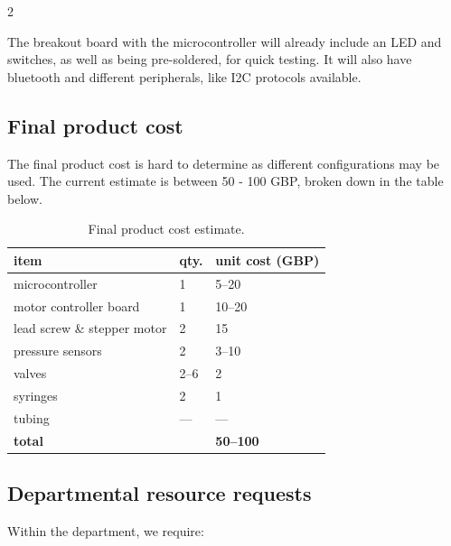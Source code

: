 \documentclass[10pt, a4paper]{article}
\begin{document}
\begin{multicols}{2}

    The breakout board with the microcontroller will already include an LED and switches, as well as being pre-soldered, for quick testing. It will also have bluetooth and different peripherals, like I2C protocols available.

    \subsection{Final product cost}
    The final product cost is hard to determine as different configurations may be used. The current estimate is between 50 - 100 GBP, broken down in the table below.

    \begin{table}[H]
        \small
        \centering
        \begin{tabular}{lll}
            \toprule
            \textbf{item}               & \textbf{qty.} & \textbf{unit cost (GBP)} \\
            \midrule
            microcontroller             & 1             & 5--20                    \\
            motor controller board      & 1             & 10--20                   \\
            lead screw \& stepper motor & 2             & 15                       \\
            pressure sensors            & 2             & 3--10                    \\
            valves                      & 2--6          & 2                        \\
            syringes                    & 2             & 1                        \\
            tubing                      & ---           & ---                      \\
            \midrule
            \textbf{total}              &               & \textbf{50--100}         \\
            \bottomrule
        \end{tabular}
        \caption{Final product cost estimate.}
    \end{table}

    \subsection{Departmental resource requests}
    Within the department, we require:


\end{multicols}
\end{document}
